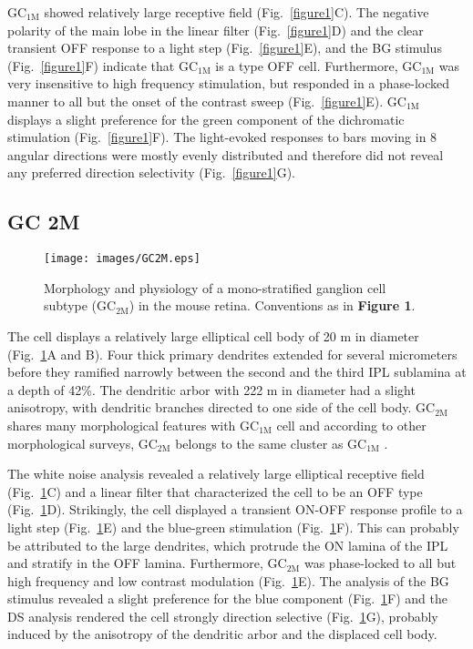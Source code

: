 GC$_{\text{1M}}$ showed relatively large receptive field (Fig.~\ref{figure1}C). The negative polarity of the main lobe in the linear filter (Fig.~\ref{figure1}D) and the clear transient OFF response to a light step (Fig.~\ref{figure1}E), and the BG stimulus (Fig.~\ref{figure1}F) indicate that GC$_{\text{1M}}$ is a type OFF cell. Furthermore, GC$_{\text{1M}}$ was very insensitive to high frequency stimulation, but responded in a phase-locked manner to all but the onset of the contrast sweep (Fig.~\ref{figure1}E). GC$_{\text{1M}}$ displays a slight preference for the green component of the dichromatic stimulation (Fig.~\ref{figure1}F). The light-evoked responses to bars moving in 8 angular directions were mostly evenly distributed and therefore did not reveal any preferred direction selectivity (Fig.~\ref{figure1}G). 
 
 
\subsection{GC 2M}     

\begin{figure}[t]
\begin{center}
\texttt{[image: images/GC2M.eps]}
\caption{Morphology and physiology of a mono-stratified ganglion cell subtype (GC$_\text{{2M}}$) in the mouse retina. Conventions as in \textbf{Figure 1}.}
\label{figure2}
\end{center}
\end{figure}

The cell displays a relatively large elliptical cell body of 20 \textmu m in diameter (Fig.~\ref{figure2}A and B). Four thick primary dendrites extended for several micrometers before they ramified narrowly between the second and the third IPL sublamina at a depth of 42\%. The dendritic arbor with 222 \textmu m in diameter had a slight anisotropy, with dendritic branches directed to one side of the cell body. GC$_{\text{2M}}$ shares many morphological features with GC$_{\text{1M}}$ cell and according to other morphological surveys, GC$_{\text{2M}}$ belongs to the same cluster as GC$_{\text{1M}}$ \citep{kong05, voelgyi09}. 

The white noise analysis revealed a relatively large elliptical receptive field (Fig.~\ref{figure2}C) and a linear filter that characterized the cell to be an OFF type (Fig.~\ref{figure2}D). Strikingly, the cell displayed a transient ON-OFF response profile to a light step (Fig.~\ref{figure2}E) and the blue-green stimulation (Fig.~\ref{figure2}F). This can probably be attributed to the large dendrites, which protrude the ON lamina of the IPL and stratify in the OFF lamina. Furthermore, GC$_{\text{2M}}$ was phase-locked to all but high frequency and low contrast modulation (Fig.~\ref{figure2}E). The analysis of the BG stimulus revealed a slight preference for the blue component (Fig.~\ref{figure2}F) and the DS analysis rendered the cell strongly direction selective (Fig.~\ref{figure2}G), probably induced by the anisotropy of the dendritic arbor and the displaced cell body. 


